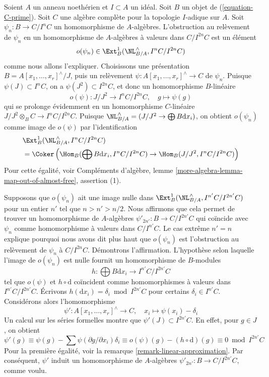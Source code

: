 \begin{remark}
\label{remark-improve-homomorphism}
Soient $A$ un anneau noethérien et $I \subset A$ un idéal. Soit $B$ un objet
de (\ref{equation-C-prime}). Soit $C$ une algèbre complète pour la topologie
$I$-adique sur $A$. Soit $\psi_n : B \to C/I^nC$ un homomorphisme de
$A$-algèbres. L'obstruction au relèvement de $\psi_n$ en un homomorphisme de
$A$-algèbres à valeurs dans $C/I^{2n}C$ est un élément
$$
o(\psi_n) \in \Ext^1_B(\NL_{B/A}^\wedge, I^nC/I^{2n}C)
$$
comme nous allons l'expliquer. Choisissons une présentation
$B = A[x_1, \ldots, x_r]^\wedge/J$, puis un relèvement
$\psi : A[x_1, \ldots, x_r]^\wedge \to C$ de $\psi_n$. Puisque
$\psi(J) \subset I^nC$, on a $\psi(J^2) \subset I^{2n}C$, et donc un
homomorphisme $B$-linéaire
$$
o(\psi) :
J/J^2 \longrightarrow I^nC/I^{2n}C, \quad g \longmapsto \psi(g)
$$
qui se prolonge évidemment en un homomorphisme $C$-linéaire
$J/J^2 \otimes_B C \to I^nC/I^{2n}C$. Puisque
$\NL_{B/A}^\wedge = (J/J^2 \to \bigoplus B \text{d}x_i)$, on obtient
$o(\psi_n)$ comme image de $o(\psi)$ par l'identification
\begin{align*}
& \Ext^1_B(\NL_{B/A}^\wedge, I^nC/I^{2n}C) \\
& =
\Coker\left(\Hom_B(\bigoplus B\text{d}x_i, I^nC/I^{2n}C) \to
\Hom_B(J/J^2, I^nC/I^{2n}C)\right)
\end{align*}
Pour cette égalité, voir Compléments d'algèbre, lemme
\ref{more-algebra-lemma-map-out-of-almost-free}, assertion (1).

\medskip\noindent
Supposons que $o(\psi_n)$ ait une image nulle dans
$\Ext^1_B(\NL_{B/A}^\wedge, I^{n'}C/I^{2n'}C)$
pour un entier $n'$ tel que $n > n' > n/2$. Nous affirmons que cela permet de
trouver un homomorphisme de $A$-algèbres
$\psi'_{2n'} : B \to C/I^{2n'}C$ qui coïncide avec $\psi_n$ comme
homomorphisme à valeurs dans $C/I^{n'}C$. Le cas extrême $n' = n$ explique
pourquoi nous avons dit plus haut que $o(\psi_n)$ est l'obstruction au
relèvement de $\psi_n$ à $C/I^{2n}C$. Démontrons l'affirmation. L'hypothèse
selon laquelle l'image de $o(\psi_n)$ est nulle fournit un homomorphisme de
$B$-modules
$$
h : \bigoplus B\text{d}x_i \longrightarrow I^{n'}C/I^{2n'}C
$$
tel que $o(\psi)$ et $h \circ \text{d}$ coïncident comme homomorphismes à
valeurs dans $I^{n'}C/I^{2n'}C$. Écrivons
$h(\text{d}x_i) = \delta_i \bmod I^{2n'}C$ pour certains
$\delta_i \in I^{n'}C$. Considérons alors l'homomorphisme
$$
\psi' : A[x_1, \ldots, x_r]^\wedge \to C,\quad
x_i \longmapsto \psi(x_i) - \delta_i
$$
Un calcul sur les séries formelles montre que
$\psi'(J) \subset I^{2n'}C$. En effet, pour $g \in J$, on obtient
$$
\psi'(g) \equiv
\psi(g) - \sum \psi(\partial g/\partial x_i)\delta_i \equiv
o(\psi)(g) - (h \circ \text{d})(g) \equiv
0 \bmod I^{2n'}C
$$
Pour la première égalité, voir la remarque
\ref{remark-linear-approximation}. Par conséquent, $\psi'$ induit un
homomorphisme de $A$-algèbres $\psi'_{2n'} : B \to C/I^{2n'}C$, comme voulu.
\end{remark}


